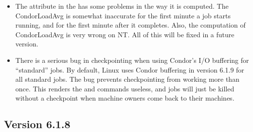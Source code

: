 \begin{itemize}

\item The  attribute in the  has
some problems in the way it is computed.
The CondorLoadAvg is somewhat inaccurate for the first minute a job
starts running, and for the first minute after it completes.
Also, the computation of CondorLoadAvg is very wrong on NT.
All of this will be fixed in a future version.

\item There is a serious bug in checkpointing when using Condor's
I/O buffering for ``standard'' jobs.
By default, Linux uses Condor buffering in version 6.1.9 for all
standard jobs.
The bug prevents checkpointing from working more than once.
This renders the  and  commands
useless, and jobs will just be killed without a checkpoint when
machine owners come back to their machines.

\end{itemize}


\subsection{\label{sec:New-6-1-8}Version 6.1.8}

